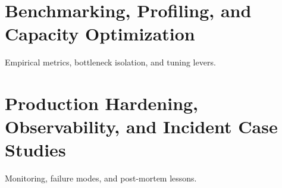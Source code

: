\documentclass[11pt,oneside]{book}
\begin{document}
\chapter{Benchmarking, Profiling, and Capacity Optimization}
\label{ch:benchmarking}
Empirical metrics, bottleneck isolation, and tuning levers.

\chapter{Production Hardening, Observability, and Incident Case Studies}
\label{ch:hardening}
Monitoring, failure modes, and post-mortem lessons.

\backmatter




\end{document}
